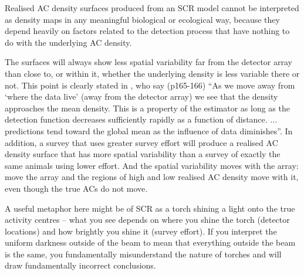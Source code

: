 \documentclass[useAMS,usenatbib,referee]{biom}
\begin{document}

Realised AC density surfaces produced from an SCR model cannot be interpreted as density maps in any meaningful biological or ecological way, because they depend heavily on factors related to the detection process that have nothing to do with the underlying AC density. 

The surfaces will always show less spatial variability far from the detector array than close to, or within it, whether the underlying density is less variable there or not. This point is clearly stated in \cite{Royle+al:13a}, who say (p165-166) ``As we move away from `where the data live' (away from the detector array) we see that the density approaches the mean density. This is a property of the estimator as long as the detection function decreases sufficiently rapidly as a function of distance. ... predictions tend toward the global mean as the influence of data diminishes''. In addition, a survey that uses greater survey effort will produce a realised AC density surface that has more spatial variability than a survey of exactly the same animals using lower effort. And the spatial variability moves with the array: move the array and the regions of high and low realised AC density move with it, even though the true ACs do not move.

A useful metaphor here might be of SCR as a torch shining a light onto the true activity centres -- what you see depends on where you shine the torch (detector locations) and how brightly you shine it (survey effort). If you interpret the uniform darkness outside of the beam to mean that everything outside the beam is the same, you fundamentally misunderstand the nature of torches and will draw fundamentally incorrect conclusions.

\end{document}
